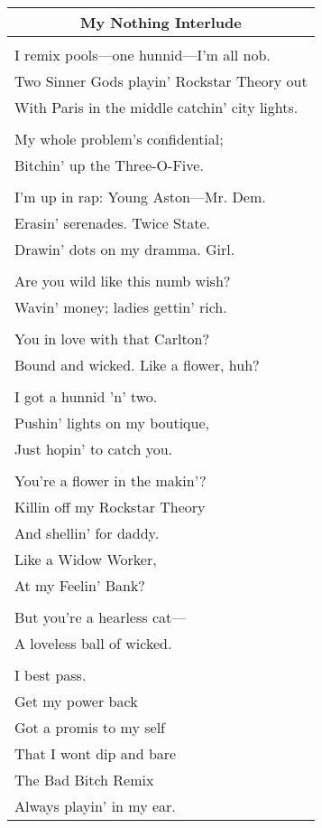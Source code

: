 \documentclass{article}
\begin{document}

\begin{center}
\begin{tabular}{l}
\multicolumn{1}{c}{\textbf{My Nothing Interlude}} \\ \hline
\\
I remix pools---one hunnid---I'm all nob. \\
Two Sinner Gods playin' Rockstar Theory out \\
With Paris in the middle catchin' city lights. \\
\\
My whole problem's confidential; \\
Bitchin' up the Three-O-Five. \\
\\
I'm up in rap: Young Aston---Mr. Dem. \\
Erasin' serenades. Twice State. \\
Drawin' dots on my dramma. Girl. \\
\\
Are you wild like this numb wish? \\
Wavin' money; ladies gettin' rich. \\
\\
You in love with that Carlton? \\
Bound and wicked. Like a flower, huh? \\
\\
I got a hunnid 'n' two. \\
Pushin' lights on my boutique, \\
Just hopin' to catch you. \\
\\
You're a flower in the makin'? \\
Killin off my Rockstar Theory \\
And shellin' for daddy. \\
Like a Widow Worker, \\
At my Feelin' Bank? \\
\\
But you're a hearless cat--- \\
A loveless ball of wicked. \\
\\
I best pass. \\
Get my power back \\
Got a promis to my self \\
That I wont dip and bare \\
The Bad Bitch Remix \\
Always playin' in my ear. \\
\end{tabular}
\end{center}
\end{document}
